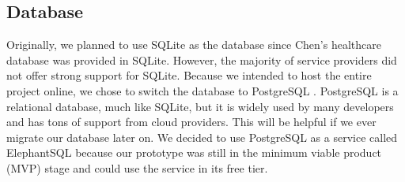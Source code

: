 




\subsection{Database}
Originally, we planned to use SQLite \cite{sqlite} as the database since Chen's healthcare database was provided in SQLite. However, the majority of service providers did not offer strong support for SQLite. Because we intended to host the entire project online, we chose to switch the database to PostgreSQL \cite{postgresql}. PostgreSQL is a relational database, much like SQLite, but it is widely used by many developers and has tons of support from cloud providers. This will be helpful if we ever migrate our database later on.
We decided to use PostgreSQL as a service called ElephantSQL \cite{elephantsql} because our prototype was still in the minimum viable product (MVP) stage and could use the service in its free tier.


